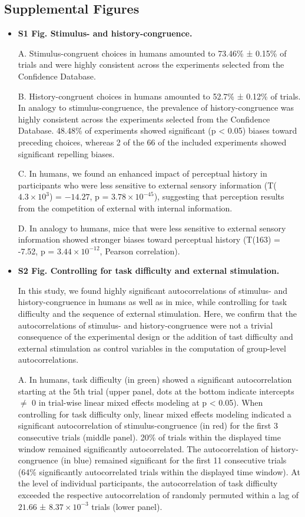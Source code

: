\documentclass[
]{article}
\begin{document}
\subsection*{{Supplemental Figures}\label{Supplemental Figures}}
\begin{itemize}
\item \textbf{S1 Fig. Stimulus- and history-congruence.} 

A. Stimulus-congruent choices in humans amounted to 73.46\% ± 0.15\% of
trials and were highly consistent across the experiments selected from
the Confidence Database. 

B. History-congruent choices in humans amounted to 52.7\% ± 0.12\% of
trials. In analogy to stimulus-congruence, the prevalence of
history-congruence was highly consistent across the experiments selected
from the Confidence Database. 48.48\% of experiments showed significant
(p \textless{} 0.05) biases toward preceding choices, whereas 2 of the
66 of the included experiments showed significant repelling biases. 

C. In humans, we found an enhanced impact of perceptual history in
participants who were less sensitive to external sensory information
(T(\(\ensuremath{4.3\times 10^{3}}\)) = \(-14.27\), p =
\(\ensuremath{3.78\times 10^{-45}}\)), suggesting that perception
results from the competition of external with internal information. 

D. In analogy to humans, mice that were less sensitive to external
sensory information showed stronger biases toward perceptual history
(T(163) = -7.52, p = \(\ensuremath{3.44\times 10^{-12}}\), Pearson
correlation).

\item \textbf{S2 Fig. Controlling for task difficulty and external stimulation.} 

In this study, we found highly significant autocorrelations of stimulus-
and history-congruence in humans as well as in mice, while controlling
for task difficulty and the sequence of external stimulation. Here, we
confirm that the autocorrelations of stimulus- and history-congruence
were not a trivial consequence of the experimental design or the
addition of tast difficulty and external stimulation as control
variables in the computation of group-level autocorrelations.

A. In humans, task difficulty (in green) showed a significant
autocorrelation starting at the 5th trial (upper panel, dots at the
bottom indicate intercepts \(\neq\) 0 in trial-wise linear mixed effects
modeling at p \textless{} 0.05). When controlling for task difficulty
only, linear mixed effects modeling indicated a significant
autocorrelation of stimulus-congruence (in red) for the first 3
consecutive trials (middle panel). 20\% of trials within the displayed
time window remained significantly autocorrelated. The autocorrelation
of history-congruence (in blue) remained significant for the first 11
consecutive trials (64\% significantly autocorrelated trials within the
displayed time window). At the level of individual participants, the
autocorrelation of task difficulty exceeded the respective
autocorrelation of randomly permuted within a lag of \(21.66\) ±
\(\ensuremath{8.37\times 10^{-3}}\) trials (lower panel).


\end{itemize}
\end{document}
